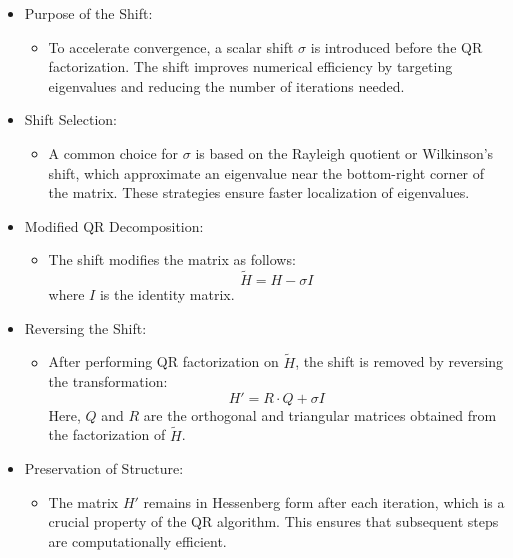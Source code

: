 \documentclass[a4paper,11pt,oneside]{report}
\begin{document}
 \begin{itemize}
   \item Purpose of the Shift:
   \begin{itemize}
       \item To accelerate convergence, a scalar shift \( \sigma \) is introduced before the QR factorization. The shift improves numerical efficiency by targeting eigenvalues and reducing the number of iterations needed.
   \end{itemize}

   \item Shift Selection:
     \begin{itemize}
         \item A common choice for \( \sigma \) is based on the Rayleigh quotient or Wilkinson’s shift, which approximate an eigenvalue near the bottom-right corner of the matrix. These strategies ensure faster localization of eigenvalues.
     \end{itemize}

   \item Modified QR Decomposition:
   \begin{itemize}
       \item The shift modifies the matrix as follows:
       \[
       \tilde{H} = H - \sigma I
       \]
       where \( I \) is the identity matrix.
   \end{itemize}

   \item  Reversing the Shift:
     \begin{itemize}
         \item After performing QR factorization on \( \tilde{H} \), the shift is removed by reversing the transformation:
       \[
       H' = R \cdot Q + \sigma I
       \]
       Here, \( Q \) and \( R \) are the orthogonal and triangular matrices obtained from the factorization of \( \tilde{H} \).
     \end{itemize}
   \item Preservation of Structure:
     \begin{itemize}
         \item The matrix \( H' \) remains in Hessenberg form after each iteration, which is a crucial property of the QR algorithm. This ensures that subsequent steps are computationally efficient.
     \end{itemize}
     \end{itemize}
\end{document}
